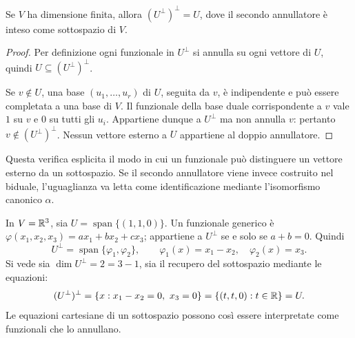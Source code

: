 \begin{proposizione}
Se $V$ ha dimensione finita, allora $(U^\perp)^\perp=U$, dove il secondo annullatore è inteso come sottospazio di $V$.
\end{proposizione}
\begin{proof}
\passomath{\supseteq} Per definizione ogni funzionale in $U^\perp$ si annulla su ogni vettore di $U$, quindi $U\subseteq(U^\perp)^\perp$.

\passomath{\subseteq} Se $v\notin U$, una base $(u_1,\ldots,u_r)$ di $U$, seguita da $v$, è indipendente e può essere completata a una base di $V$. Il funzionale della base duale corrispondente a $v$ vale $1$ su $v$ e $0$ su tutti gli $u_i$. Appartiene dunque a $U^\perp$ ma non annulla $v$: pertanto $v\notin(U^\perp)^\perp$. Nessun vettore esterno a $U$ appartiene al doppio annullatore.
\end{proof}
Questa verifica esplicita il modo in cui un funzionale può distinguere un vettore esterno da un sottospazio. Se il secondo annullatore viene invece costruito nel biduale, l'uguaglianza va letta come identificazione mediante l'isomorfismo canonico $\alpha$.

\begin{esempio}
In $V=\mathbb{R}^3$, sia $U=\operatorname{span}\{(1,1,0)\}$. Un funzionale generico è $\varphi(x_1,x_2,x_3)=ax_1+bx_2+cx_3$; appartiene a $U^\perp$ se e solo se $a+b=0$. Quindi
\[
 U^\perp=\operatorname{span}\{\varphi_1,\varphi_2\},\qquad
 \varphi_1(x)=x_1-x_2,\quad\varphi_2(x)=x_3.
\]
Si vede sia $\dim U^\perp=2=3-1$, sia il recupero del sottospazio mediante le equazioni:
\[
 (U^\perp)^\perp=\{x:x_1-x_2=0,\ x_3=0\}
 =\{(t,t,0):t\in\mathbb{R}\}=U.
\]
Le equazioni cartesiane di un sottospazio possono così essere interpretate come funzionali che lo annullano.
\end{esempio}
